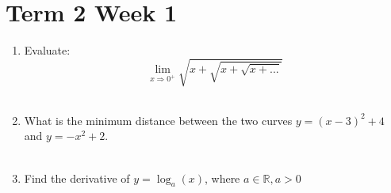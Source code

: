 \documentclass[../main.tex]{subfiles}
\begin{document}
\section*{Term 2 Week 1}
\begin{enumerate}
    \item 
    Evaluate:\\
    \[\lim_{x\Rightarrow0^+}\sqrt{x+\sqrt{x+\sqrt{x+...}}} \]\\

    \item 
    What is the minimum distance between the two curves \(y=(x-3)^2+4\) and \(y=-x^2+2\).\\ \\

    \item 
    Find the derivative of \(y=\log_a(x)\), where \(a \in \mathbb{R}, a>0\)
\end{enumerate}
\end{document}
